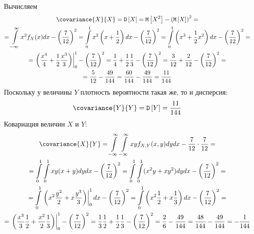 \documentclass[12pt,a4paper]{article}
\begin{document}
\begin{enumerate}
        Вычисляем
        \begin{multline}
            \covariance{X}{X} = \variance{X} = \expectation{X^2} - \left ( \expectation{X} \right )^2 = \\
            = \int \limits_{-\infty}^{\infty} x^2 f_X(x) dx - \left ( \frac{7}{12} \right )^2
            = \int \limits_0^1 x^2 \left ( x + \frac{1}{2} \right ) dx - \left ( \frac{7}{12} \right )^2
            = \int \limits_0^1 \left ( x^3 + \frac{1}{2} x^2 \right ) dx - \left ( \frac{7}{12} \right )^2 = \\
%
            = \left . \left ( \frac{x^4}{4} + \frac{1}{2} \frac{x^3}{3} \right ) \right |_0^1 - \left ( \frac{7}{12} \right )^2
            = \frac{1}{4} + \frac{1}{2} \frac{1}{3} - \left ( \frac{7}{12} \right )^2
            = \frac{3}{12} + \frac{2}{12} - \left ( \frac{7}{12} \right )^2 = \\
%
            = \frac{5}{12} - \frac{49}{144}
            = \frac{60}{144} - \frac{49}{144}
            = \frac{11}{144}
        \end{multline}
        Поскольку у величины $Y$ плотность вероятности такая же, то и дисперсия:
        \begin{equation}
            \covariance{Y}{Y} = \variance{Y} = \frac{11}{144}
        \end{equation}
        Ковариация величин $X$ и $Y$:
        \begin{multline}
            \covariance{X}{Y}
            = \int \limits_{-\infty}^{\infty} \int \limits_{-\infty}^{\infty} x y f_{X,Y}(x,y) dy dx - \frac{7}{12} \cdot \frac{7}{12} = \\
%
            = \int \limits_0^1 \int \limits_0^1 x y ( x + y ) dy dx - \left ( \frac{7}{12} \right )^2
            = \int \limits_0^1 \int \limits_0^1 ( x^2 y + x y^2 ) dy dx - \left ( \frac{7}{12} \right )^2 = \\
%
            = \int \limits_0^1 \left . \left ( x^2 \frac{y^2}{2} + x \frac{y^3}{3} \right ) \right |_0^1 dx - \left ( \frac{7}{12} \right )^2
            = \int \limits_0^1 \left ( x^2 \frac{1}{2} + x \frac{1}{3} \right ) dx - \left ( \frac{7}{12} \right )^2 = \\
%
            = \left . \left ( \frac{x^3}{3} \frac{1}{2} + \frac{x^2}{2} \frac{1}{3} \right ) \right |_0^1 - \left ( \frac{7}{12} \right )^2
            = \frac{1}{3} \frac{1}{2} + \frac{1}{2} \frac{1}{3} - \left ( \frac{7}{12} \right )^2
            = \frac{2}{6} - \frac{49}{144}
            = \frac{48}{144} - \frac{49}{144}
            = - \frac{1}{144}
        \end{multline}


\end{enumerate}
\end{document}

